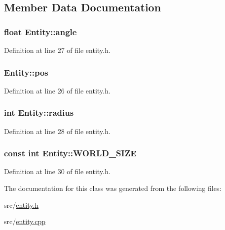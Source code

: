 \subsection{Member Data Documentation}
\hypertarget{class_entity_abb6791bd923767cdf42a7e3101a6f76d}{
\subsubsection[{angle}]{\setlength{\rightskip}{0pt plus 5cm}float Entity\-::angle\hspace{0.3cm}{\ttfamily [protected]}}}\label{class_entity_abb6791bd923767cdf42a7e3101a6f76d}


Definition at line 27 of file entity.\-h.

\hypertarget{class_entity_a885ee23e7a2132f0d890bb2e312e6d77}{
\subsubsection[{pos}]{ Entity\-::pos\hspace{0.3cm}{\ttfamily [protected]}}}\label{class_entity_a885ee23e7a2132f0d890bb2e312e6d77}


Definition at line 26 of file entity.\-h.

\hypertarget{class_entity_acd7af12063926ab8cd654539328e5532}{
\subsubsection[{radius}]{\setlength{\rightskip}{0pt plus 5cm}int Entity\-::radius\hspace{0.3cm}{\ttfamily [protected]}}}\label{class_entity_acd7af12063926ab8cd654539328e5532}


Definition at line 28 of file entity.\-h.

\hypertarget{class_entity_a2b870ef127d06e3f98109695817a1798}{
\subsubsection[{W\-O\-R\-L\-D\-\_\-\-S\-I\-Z\-E}]{\setlength{\rightskip}{0pt plus 5cm}const int Entity\-::\-W\-O\-R\-L\-D\-\_\-\-S\-I\-Z\-E\hspace{0.3cm}{\ttfamily [protected]}}}\label{class_entity_a2b870ef127d06e3f98109695817a1798}


Definition at line 30 of file entity.\-h.



The documentation for this class was generated from the following files\-:\begin{DoxyCompactItemize}
\item 
src/\hyperlink{entity_8h}{entity.\-h}\item 
src/\hyperlink{entity_8cpp}{entity.\-cpp}\end{DoxyCompactItemize}
